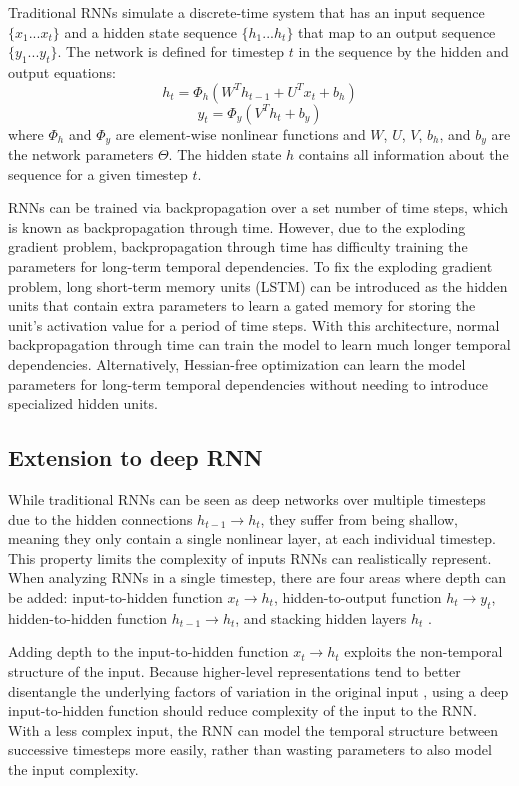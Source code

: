 Traditional RNNs simulate a discrete-time system that has an input sequence \(\{x_1...x_t\}\) and a hidden state sequence \(\{h_1...h_t\}\) that map to an output sequence \(\{y_1...y_t\}\). The network is defined for timestep \(t\) in the sequence by the hidden and output equations:
\begin{equation}
	h_t = \Phi_h(W^Th_{t-1} + U^Tx_t + b_h)
\end{equation}
\begin{equation}
	y_t = \Phi_y(V^Th_t + b_y)
\end{equation}
where \(\Phi_h\) and \(\Phi_y\) are element-wise nonlinear functions and \(W\), \(U\), \(V\), \(b_h\), and \(b_y\) are the network parameters \(\Theta\). The hidden state \(h\) contains all information about the sequence for a given timestep \(t\).

RNNs can be trained via backpropagation over a set number of time steps, which is known as backpropagation through time. However, due to the exploding gradient problem, backpropagation through time has difficulty training the parameters for long-term temporal dependencies. To fix the exploding gradient problem, long short-term memory units (LSTM) \cite{lstm} can be introduced as the hidden units that contain extra parameters to learn a gated memory for storing the unit's activation value for a period of time steps. With this architecture, normal backpropagation through time can train the model to learn much longer temporal dependencies. Alternatively, Hessian-free optimization \cite{hessian_free} can learn the model parameters for long-term temporal dependencies without needing to introduce specialized hidden units.

\subsection{Extension to deep RNN}
While traditional RNNs can be seen as deep networks over multiple timesteps due to the hidden connections \(h_{t-1} \rightarrow h_t\), they suffer from being shallow, meaning they only contain a single nonlinear layer, at each individual timestep. This property limits the complexity of inputs RNNs can realistically represent. When analyzing RNNs in a single timestep, there are four areas where depth can be added: input-to-hidden function \(x_t \rightarrow h_t\), hidden-to-output function \(h_t \rightarrow y_t\), hidden-to-hidden function \(h_{t-1} \rightarrow h_t\), and stacking hidden layers \(h_t\) \cite{deep_rnn}.

Adding depth to the input-to-hidden function \(x_t \rightarrow h_t\) exploits the non-temporal structure of the input. Because higher-level representations tend to better disentangle the underlying factors of variation in the original input \cite{bengio13}, using a deep input-to-hidden function should reduce complexity of the input to the RNN. With a less complex input, the RNN can model the temporal structure between successive timesteps more easily, rather than wasting parameters to also model the input complexity.

